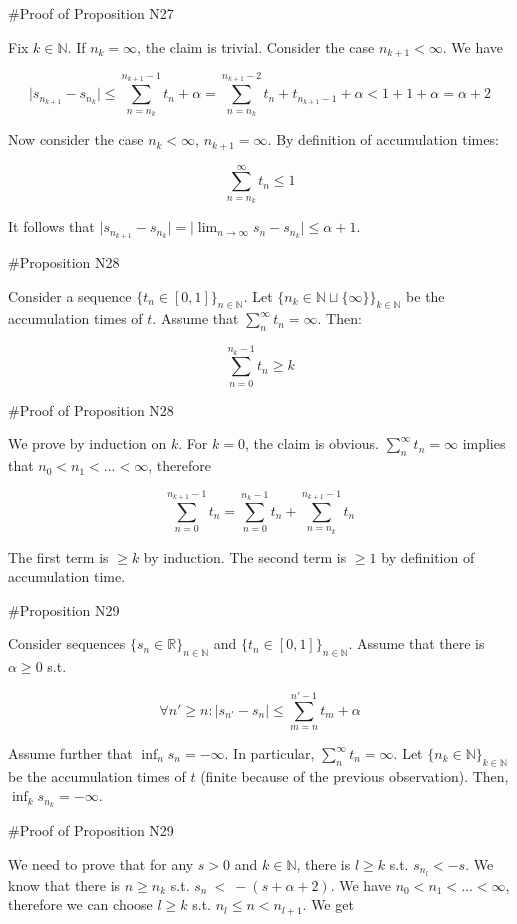 \documentclass[a4paper]{article}
\newcommand{\Nats}{\mathbb{N}}
\newcommand{\Reals}{\mathbb{R}}
\newcommand{\Abs}[1]{\lvert #1 \rvert}
\begin{document}
\#Proof of Proposition N27

Fix ${k \in \Nats}$. If ${n_k = \infty}$, the claim is trivial. Consider the case ${n_{k+1} < \infty}$. We have

$$\Abs{s_{n_{k+1}}-s_{n_k}} \leq \sum_{n=n_k}^{n_{k+1}-1} t_n + \alpha = \sum_{n=n_k}^{n_{k+1}-2} t_n + t_{n_{k+1}-1} + \alpha < 1+1 + \alpha= \alpha + 2$$

Now consider the case ${n_k < \infty}$, ${n_{k+1} = \infty}$. By definition of accumulation times:

$$\sum_{n=n_k}^{\infty} t_n \leq 1$$

It follows that $\Abs{s_{n_{k+1}}-s_{n_k}} = \Abs{\lim_{n \rightarrow \infty} s_{n}-s_{n_k}} \leq \alpha + 1$.

\#Proposition N28

Consider a sequence ${\{t_n \in [0,1]\}_{n \in \Nats}}$. Let ${\{n_k \in \Nats \sqcup \{\infty\}\}_{k \in \Nats}}$ be the accumulation times of ${t}$. Assume that ${\sum_n^\infty t_n = \infty}$. Then:

$$\sum_{n = 0}^{n_k - 1} t_n \geq k$$

\#Proof of Proposition N28

We prove by induction on ${k}$. For ${k=0}$, the claim is obvious. ${\sum_n^\infty t_n = \infty}$ implies that ${n_0 < n_1 < \ldots < \infty}$, therefore

$$\sum_{n = 0}^{n_{k+1} - 1} t_n = \sum_{n = 0}^{n_{k} - 1} t_n + \sum_{n = n_k}^{n_{k+1} - 1} t_n$$

The first term is ${\geq k}$ by induction. The second term is ${\geq 1}$ by definition of accumulation time.

\#Proposition N29

Consider sequences ${\{s_n \in \Reals\}_{n \in \Nats}}$ and ${\{t_n \in [0,1]\}_{n \in \Nats}}$. Assume that there is ${\alpha \geq 0}$ s.t.

$${\forall n' \geq n: \Abs{s_{n'}-s_n} \leq \sum_{m=n}^{n'-1} t_m + \alpha}$$

Assume further that ${\inf_n s_n = -\infty}$. In particular, ${\sum_n^\infty t_n = \infty}$. Let ${\{n_k \in \Nats\}_{k \in \Nats}}$ be the accumulation times of ${t}$ (finite because of the previous observation).  Then, ${\inf_k s_{n_k} = -\infty}$.

\#Proof of Proposition N29

We need to prove that for any ${s > 0}$ and ${k \in \Nats}$, there is ${l \geq k}$ s.t. ${s_{n_l} < -s}$. We know that there is ${n \geq n_k}$ s.t. ${s_n\ <\ -(s+\alpha+2)}$. We have ${n_0 < n_1 < \ldots < \infty}$, therefore we can choose ${l \geq k}$ s.t. ${n_l \leq n < n_{l+1}}$. We get
\end{document}

